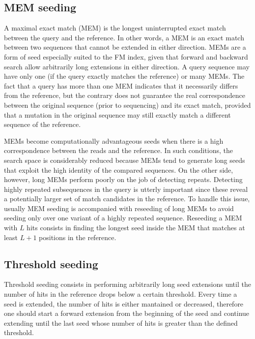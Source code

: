 
\subsection{MEM seeding}
A maximal exact match (MEM) is the longest uninterrupted exact match
between the query and the reference. In other words, a MEM is an exact
match between two sequences that cannot be extended in either
direction. MEMs are a form of seed especially suited to the FM
index, given that forward and backward search allow arbitrarily long
extensions in either direction. A query sequence may have only one (if
the query exactly matches the reference) or many MEMs. The fact that a
query has more than one MEM indicates that it necessarily differs from
the reference, but the contrary does not guarantee the real
correspondence between the original sequence (prior to sequencing) and
its exact match, provided that a mutation in the original sequence may
still exactly match a different sequence of the reference.

MEMs become computationally advantageous seeds when there is a high
correspondence between the reads and the reference. In such
conditions, the search space is considerably reduced because MEMs tend
to generate long seeds that exploit the high identity of
the compared sequences. On the other side, however, long MEMs perform
poorly on the job of detecting repeats. Detecting highly repeated
subsequences in the query is utterly important since these reveal a
potentially larger set of match candidates in the reference. To
handle this issue, usually MEM seeding is accompanied with reseeding
of long MEMs to avoid seeding only over one variant of a highly
repeated sequence. Reseeding a MEM with $L$ hits consists in finding
the longest seed inside the MEM that matches at least $L+1$ positions
in the reference. 

\subsection{Threshold seeding}
Threshold seeding consists in performing arbitrarily long seed
extensions until the number of hits in the reference drops below a
certain threshold. Every time a seed is extended, the number of hits
is either mantained or decreased, therefore one should start a forward
extension from the beginning of the seed and continue extending until
the last seed whose number of hits is greater than the defined
threshold.

